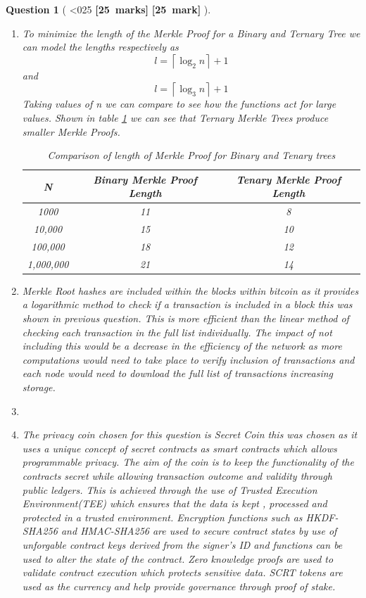 \documentclass[a4paper]{article}
\theoremstyle{que}
\newtheorem{question}{Question}
\newcommand\points[1]{%
\ifnum1<0#1\relax%
    {\bf \small [#1~marks]}%
  \else%
    {\bf \small [#1~mark]}%
  \fi%
}%
\begin{document}
\begin{question}[\points{25}]
\begin{enumerate}[label=(\alph*)]
    \item[(iii)] To minimize the length of the Merkle Proof for a Binary and Ternary Tree we can model the lengths respectively as \[ l = \left\lceil \log_2 n \right\rceil + 1\] and \[ l = \left\lceil \log_3 n \right\rceil + 1\]
    Taking values of n we can compare to see how the functions act for large values. Shown in table \ref{table:two_column_blank} we can see that Ternary Merkle Trees produce smaller Merkle Proofs.
    \begin{table}[h!]
    \centering
    \begin{tabular}{|c|c|c|}
    \hline
    \textbf{N} & \textbf{Binary Merkle Proof Length} & \textbf{Tenary Merkle Proof Length} \\ 
    \hline
             1000 &  11 &   8   \\ 
    \hline
                  10,000  &  15 &    10            \\ 
    \hline
                100,000     & 18  &      12          \\ 
    \hline
               1,000,000      &  21  &       14        \\ 
    \hline
    \end{tabular}
    \caption{Comparison of length of Merkle Proof for Binary and Tenary trees}
    \label{table:two_column_blank}
    \end{table}
    
    \item Merkle Root hashes are included within the blocks within bitcoin as it provides a logarithmic method to check if a transaction is included in a block this was shown in previous question. This is more efficient than the linear method of checking each transaction in the full list individually. The impact of not including this would be a decrease in the efficiency of the network as more computations would need to take place to verify inclusion of transactions and each node would need to download the full list of transactions increasing storage. 

    \item 
    
    \item[(i)] The privacy coin chosen for this question is Secret Coin \cite{secret_network_graypaper} this was chosen as it uses a unique concept of secret contracts as smart contracts which allows programmable privacy. The aim of the coin is to keep the functionality of the contracts secret while allowing transaction outcome and validity through public ledgers. This is achieved through the use of Trusted Execution Environment(TEE) which ensures that the data is kept , processed and protected in a trusted environment. Encryption functions such as HKDF-SHA256 and HMAC-SHA256 are used to secure contract states by use of unforgable contract keys derived from the signer's ID and functions can be used to alter the state of the contract. Zero knowledge proofs are used to validate contract execution which protects sensitive data. SCRT tokens are used as the currency and help provide governance through proof of stake. \cite{secret_foundation_docs}
    

\end{enumerate}
\end{question}
\end{document}
